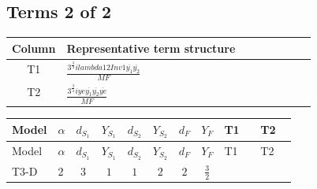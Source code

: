 \documentclass[8pt]{article}
\begin{document}
\begin{landscape}
\subsection*{Terms 2 of 2}
\begin{center}
\begin{tabular}{@{}c >{\raggedright\arraybackslash}p{0.82\linewidth}@{}}
\toprule
Column & Representative term structure \\
\midrule
T1 & \(\displaystyle \frac{3^{\frac{3}{4}} i lambda12Inv1 \overline{y_{1}} \overline{y_{2}}}{MF}\) \\
\midrule
T2 & \(\displaystyle \frac{3^{\frac{3}{4}} i ye \overline{y_{1}} \overline{y_{2}} \overline{ye}}{MF}\) \\
\midrule
\bottomrule
\end{tabular}
\end{center}
\smallskip
\tiny
\begin{longtable}{@{}llcccccc >{\raggedright\arraybackslash}p{0.21\linewidth} >{\raggedright\arraybackslash}p{0.21\linewidth}@{}}
\toprule
Model & $\alpha$ & $d_{S_1}$ & $Y_{S_1}$ & $d_{S_2}$ & $Y_{S_2}$ & $d_F$ & $Y_F$ & T1 & T2 \\
\midrule
\endfirsthead
\toprule
Model & $\alpha$ & $d_{S_1}$ & $Y_{S_1}$ & $d_{S_2}$ & $Y_{S_2}$ & $d_F$ & $Y_F$ & T1 & T2 \\
\midrule
\endhead
T3-D & $2$ & $3$ & $1$ & $1$ & $2$ & $2$ & $\frac{3}{2}$ & \scriptsize\adjustbox{max width=\linewidth}{$\begin{gathered} - \frac{3^{\frac{3}{4}} i lambda12Inv1 \overline{y_{1}} \overline{y_{2}}}{6 MF}\end{gathered}$} & \scriptsize\adjustbox{max width=\linewidth}{$\begin{gathered} \frac{3^{\frac{3}{4}} i ye \overline{y_{1}} \overline{y_{2}} \overline{ye}}{12 MF}\end{gathered}$} \\
\midrule
\bottomrule
\end{longtable}
\end{landscape}
\end{document}
